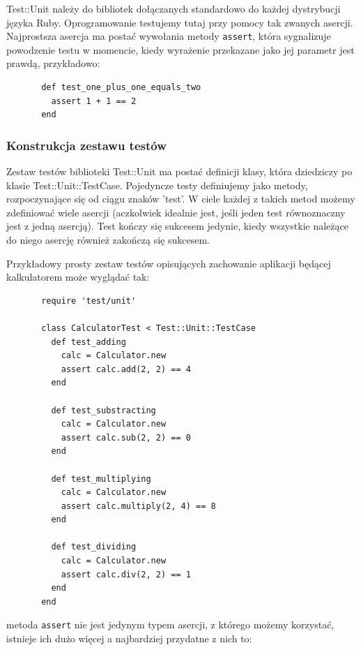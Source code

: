     Test::Unit należy do bibliotek dołączanych standardowo do każdej dystrybucji języka Ruby. Oprogramowanie testujemy tutaj przy pomocy tak zwanych asercji. Najprostsza asercja ma postać wywołania metody \verb+assert+, która sygnalizuje powodzenie testu w momencie, kiedy wyrażenie przekazane jako jej parametr jest prawdą, przykładowo:
    
     \begin{verbatim}
       def test_one_plus_one_equals_two
         assert 1 + 1 == 2
       end
     \end{verbatim}
     
     \subsubsection{Konstrukcja zestawu testów}
     Zestaw testów biblioteki Test::Unit ma postać definicji klasy, która dziedziczy po klasie Test::Unit::TestCase. Pojedyncze testy definiujemy jako metody, rozpoczynające się od ciągu znaków 'test'. W ciele każdej z takich metod możemy zdefiniować wiele asercji (aczkolwiek idealnie jest, jeśli jeden test równoznaczny jest z jedną asercją). Test kończy się sukcesem jedynie, kiedy wszystkie należące do niego asercję również zakończą się sukcesem.
     
     Przykładowy prosty zestaw testów opisujących zachowanie aplikacji będącej kalkulatorem może wyglądać tak:
     
     \begin{verbatim}
       require 'test/unit'
       
       class CalculatorTest < Test::Unit::TestCase
         def test_adding
           calc = Calculator.new
           assert calc.add(2, 2) == 4
         end
         
         def test_substracting
           calc = Calculator.new
           assert calc.sub(2, 2) == 0
         end
         
         def test_multiplying
           calc = Calculator.new
           assert calc.multiply(2, 4) == 8
         end
         
         def test_dividing
           calc = Calculator.new
           assert calc.div(2, 2) == 1
         end
       end
     \end{verbatim}
     
     metoda \verb+assert+ nie jest jedynym typem asercji, z którego możemy korzystać, istnieje ich dużo więcej a najbardziej przydatne z nich to:
     
